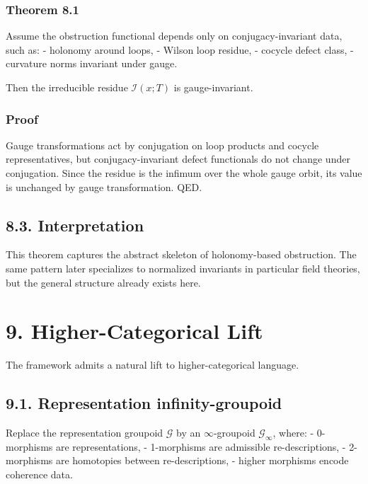 \documentclass[
]{article}
\begin{document}
\subsubsection{Theorem 8.1}\label{theorem-8.1}

Assume the obstruction functional depends only on conjugacy-invariant
data, such as: - holonomy around loops, - Wilson loop residue, - cocycle
defect class, - curvature norms invariant under gauge.

Then the irreducible residue \(\mathcal{I}(x;T)\) is gauge-invariant.

\subsubsection{Proof}\label{proof-6}

Gauge transformations act by conjugation on loop products and cocycle
representatives, but conjugacy-invariant defect functionals do not
change under conjugation. Since the residue is the infimum over the
whole gauge orbit, its value is unchanged by gauge transformation. QED.

\subsection{8.3. Interpretation}\label{interpretation-1}

This theorem captures the abstract skeleton of holonomy-based
obstruction. The same pattern later specializes to normalized invariants
in particular field theories, but the general structure already exists
here.

\section{9. Higher-Categorical Lift}\label{higher-categorical-lift}

The framework admits a natural lift to higher-categorical language.

\subsection{9.1. Representation
infinity-groupoid}\label{representation-infinity-groupoid}

Replace the representation groupoid \(\mathcal{G}\) by an
\(\infty\)-groupoid \(\mathcal{G}_\infty\), where: - 0-morphisms are
representations, - 1-morphisms are admissible re-descriptions, -
2-morphisms are homotopies between re-descriptions, - higher morphisms
encode coherence data.
\end{document}
